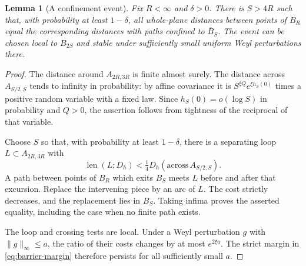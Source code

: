 \documentclass[11pt]{article}
\newtheorem{lemma}[theorem]{Lemma}
\theoremstyle{definition}
\theoremstyle{remark}
\newcommand{\len}{\operatorname{len}}
\begin{document}
\begin{lemma}[A confinement event]\label{lem:barrier}
Fix $R<\infty$ and $\delta>0$. There is $S>4R$ such that, with
probability at least $1-\delta$, all whole-plane distances between
points of $B_R$ equal the corresponding distances with paths
confined to $\overline B_S$. The event can be chosen local to
$B_{2S}$ and stable under sufficiently small uniform Weyl
perturbations there.
\end{lemma}
\begin{proof}
The distance around $A_{2R,3R}$ is finite almost surely. The
distance across $A_{S/2,S}$ tends to infinity in probability:
by affine covariance it is $S^{\xi Q}e^{\xi h_S(0)}$ times a
positive random variable with a fixed law. Since
$h_S(0)=o(\log S)$ in probability and $Q>0$, the assertion
follows from tightness of the reciprocal of that variable.

Choose $S$ so that, with probability at least $1-\delta$, there
is a separating loop $L\subset A_{2R,3R}$ with
\begin{equation}\label{eq:barrier-margin}
             \len(L;D_h)<\tfrac14
                         D_h(\mathrm{across}\,A_{S/2,S}).
\end{equation}
A path between points of $B_R$ which exits $B_S$ meets $L$
before and after that excursion. Replace the intervening piece
by an arc of $L$. The cost strictly decreases, and the replacement
lies in $B_S$. Taking infima proves the asserted equality,
including the case when no finite path exists.

The loop and crossing tests are local. Under a Weyl perturbation
$g$ with $\|g\|_\infty\le a$, the ratio of their costs changes
by at most $e^{2\xi a}$. The strict margin in
\eqref{eq:barrier-margin} therefore persists for all sufficiently
small $a$.
\end{proof}
\end{document}
